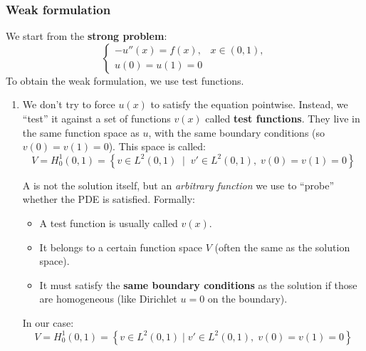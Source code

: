\subsubsection{Weak formulation}\label{subsubsection: Weak formulation}

We start from the \textbf{strong problem}:
\begin{equation*}
    \begin{cases}
        - u''(x) = f(x), & x \in (0,1), \\[.5em]
        u(0)=u(1)=0 &
    \end{cases}
\end{equation*}
To obtain the weak formulation, we use test functions.
\begin{enumerate}
    \item {} We don't try to force $u(x)$ to satisfy the equation pointwise. Instead, we ``test'' it against a set of functions $v(x)$ called \textbf{test functions}. They live in the same function space as $u$, with the same boundary conditions (so $v(0)=v(1)=0$). This space is called:
    \begin{equation}
        V = H^1_0(0,1) = \left\{ v \in L^2(0,1) \;\;|\;\; v' \in L^2(0,1),\; v(0)=v(1)=0 \right\}
    \end{equation}

    \begin{deepeningbox}
        A  is not the solution itself, but an \emph{arbitrary function} we use to ``probe'' whether the PDE is satisfied. Formally:
        \begin{itemize}
            \item A test function is usually called $v(x)$.
            \item It belongs to a certain function space $V$ (often the same as the solution space).
            \item It must satisfy the \textbf{same boundary conditions} as the solution if those are homogeneous (like Dirichlet $u=0$ on the boundary).
        \end{itemize}
        In our case:
        \begin{equation*}
            V = H^1_0(0,1) = \left\{ v \in L^2(0,1) \mid v' \in L^2(0,1),\; v(0)=v(1)=0 \right\}
        \end{equation*}


\end{deepeningbox}
\end{enumerate}
